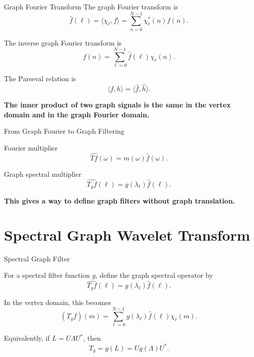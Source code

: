 \documentclass[aspectratio=1610,xcolor=dvipsnames,t]{beamer}
\newcommand{\keyterm}[1]{\textcolor{unirot}{\textbf{#1}}}
\begin{document}
\begin{frame}{Graph Fourier Transform}
The graph Fourier transform is
\[
\widehat f(\ell)
=
\langle \chi_\ell,f\rangle
=
\sum_{n=0}^{N-1}
\chi_\ell^*(n)f(n).
\tag{SGWT Eq. 18}
\]

The inverse graph Fourier transform is
\[
f(n)
=
\sum_{\ell=0}^{N-1}
\widehat f(\ell)\chi_\ell(n).
\tag{SGWT Eq. 19}
\]

The Parseval relation is
\[
\langle f,h\rangle
=
\langle \widehat f,\widehat h\rangle.
\tag{SGWT Eq. 20}
\]

\keyterm{The inner product of two graph signals is the same in the vertex domain and in the graph Fourier domain.}
\end{frame}

\begin{frame}{From Graph Fourier to Graph Filtering}
\begin{block}{Fourier multiplier}
\[
\widehat{Tf}(\omega)
=
m(\omega)\widehat f(\omega).
\]
\end{block}

\begin{block}{Graph spectral multiplier}
\[
\widehat{T_g f}(\ell)
=
g(\lambda_\ell)\widehat f(\ell).
\]
\end{block}

\begin{center}
\keyterm{This gives a way to define graph filters without graph translation.}
\end{center}
\end{frame}

\section[SGWT]{Spectral Graph Wavelet Transform}
\begin{frame}{Spectral Graph Filter}

For a spectral filter function $g$, define the graph spectral operator by
\[
\widehat{T_g f}(\ell)
=
g(\lambda_\ell)\widehat f(\ell).
\tag{SGWT Eq.~21}
\]

In the vertex domain, this becomes
\[
(T_g f)(m)
=
\sum_{\ell=0}^{N-1}
g(\lambda_\ell)\widehat f(\ell)\chi_\ell(m).
\tag{SGWT Eq.~22}
\]

Equivalently, if $L=U\Lambda U^*$, then
\[
T_g
=
g(L)
=
U g(\Lambda)U^*.
\]

\vspace{0.4em}

\end{frame}
\end{document}
